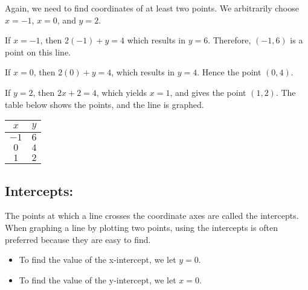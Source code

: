 \begin{solution} Again, we need to find coordinates of at least two points. We arbitrarily choose $x = -1$, $x = 0$, and $y = 2$.

If $x = -1$, then $2(-1) + y = 4$ which results in $y = 6$. Therefore, $(-1, 6)$ is a point on this line.

If $x = 0$, then $2(0) + y = 4$, which results in $y = 4$. Hence the point $(0, 4)$.

If $y = 2$, then $2x + 2 = 4$, which yields $x = 1$, and gives the point $(1, 2)$. The table below shows the points, and the line is graphed.

\begin{center}
\begin{tabular}{c|c}
    $x$ & $y$ \\
    \hline
    $-1$ & $6$ \\
    $0$  & $4$ \\
    $1$  & $2$
\end{tabular}
\end{center}

\begin{center}
\end{center}


\end{solution}

\subsection{Intercepts:} The points at which a line crosses the coordinate axes are called the intercepts. When graphing a line by plotting two points, using the intercepts is often preferred because they are easy to find.
\begin{itemize}
    \item To find the value of the x-intercept, we let $y = 0$.
    \item To find the value of the y-intercept, we let $x = 0$.
\end{itemize}

